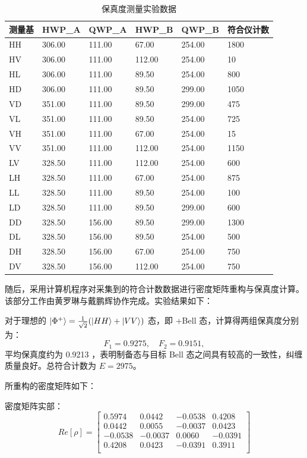 \begin{table}[h!]
	\centering
	\begin{tabular}{|l|l|l|l|l|l|}
		\hline
		测量基 & HWP\_A & QWP\_A & HWP\_B & QWP\_B & 符合仪计数 \\ \hline
		HH & 306.00 & 111.00 & 67.00 & 254.00 & 1800 \\ \hline
		HV & 306.00 & 111.00 & 112.00 & 254.00 & 10 \\ \hline
		HL & 306.00 & 111.00 & 89.50 & 254.00 & 800 \\ \hline
		HD & 306.00 & 111.00 & 89.50 & 299.00 & 1050 \\ \hline
		VD & 351.00 & 111.00 & 89.50 & 299.00 & 475 \\ \hline
		VL & 351.00 & 111.00 & 89.50 & 254.00 & 725 \\ \hline
		VH & 351.00 & 111.00 & 67.00 & 254.00 & 15 \\ \hline
		VV & 351.00 & 111.00 & 112.00 & 254.00 & 1150 \\ \hline
		LV & 328.50 & 111.00 & 112.00 & 254.00 & 600 \\ \hline
		LH & 328.50 & 111.00 & 67.00 & 254.00 & 875 \\ \hline
		LL & 328.50 & 111.00 & 89.50 & 254.00 & 100 \\ \hline
		LD & 328.50 & 111.00 & 89.50 & 299.00 & 600 \\ \hline
		DD & 328.50 & 156.00 & 89.50 & 299.00 & 1300 \\ \hline
		DL & 328.50 & 156.00 & 89.50 & 254.00 & 500 \\ \hline
		DH & 328.50 & 156.00 & 67.00 & 254.00 & 750 \\ \hline
		DV & 328.50 & 156.00 & 112.00 & 254.00 & 750 \\ \hline
	\end{tabular}
	\caption{保真度测量实验数据}
	\label{tab3}
\end{table}

随后，采用计算机程序对采集到的符合计数数据进行密度矩阵重构与保真度计算。该部分工作由黄罗琳与戴鹏辉协作完成。实验结果如下：

对于理想的 $\ket{\Phi^+} = \frac{1}{\sqrt{2}}(\ket{HH} + \ket{VV})$ 态，即 +Bell 态，计算得两组保真度分别为：
\[
F_1 = 0.9275,\quad F_2 = 0.9151,
\]
平均保真度约为 0.9213 ，表明制备态与目标 Bell 态之间具有较高的一致性，纠缠质量良好。总符合计数为 $E = 2975$。

所重构的密度矩阵如下：

密度矩阵实部：
\[
Re[\rho]=\begin{bmatrix}
	0.5974 & 0.0442 & -0.0538 & 0.4208 \\
	0.0442 & 0.0055 & -0.0037 & 0.0423 \\
	-0.0538 & -0.0037 & 0.0060 & -0.0391 \\
	0.4208 & 0.0423 & -0.0391 & 0.3911 \\
\end{bmatrix}
\]

